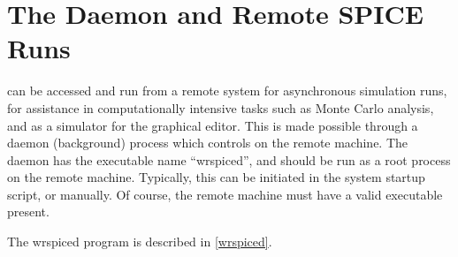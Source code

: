 \section{The {\WRspice} Daemon and Remote SPICE Runs}


{\WRspice} can be accessed and run from a remote system for
asynchronous simulation runs, for assistance in computationally
intensive tasks such as Monte Carlo analysis, and as a simulator for
the {\Xic} graphical editor.  This is made possible through a daemon
(background) process which controls {\WRspice} on the remote
machine.  The daemon has the executable name ``wrspiced'', and
should be run as a root process on the remote machine.  Typically,
this can be initiated in the system startup script, or manually.  Of
course, the remote machine must have a valid {\WRspice} executable
present.

The {\vt wrspiced} program is described in \ref{wrspiced}.

